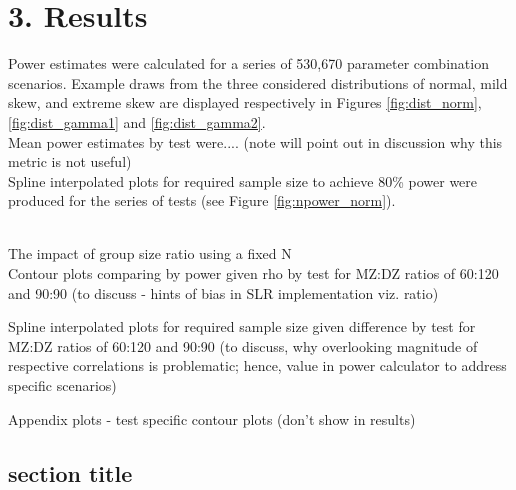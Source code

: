 \chapter*{3. Results}
\setcounter{chapter}{3}
\setcounter{section}{0}

Power estimates were calculated for a series of 530,670 parameter combination scenarios. Example draws from the three considered distributions of normal, mild skew, and extreme skew are displayed respectively in Figures \ref{fig:dist_norm}, \ref{fig:dist_gamma1} and \ref{fig:dist_gamma2}.
\\
Mean power estimates by test were.... (note will point out in discussion why this metric is not useful)
\\
Spline interpolated plots for required sample size to achieve 80\% power were produced for the series of tests (see Figure \ref{fig:npower_norm}).

\\
The impact of group size ratio using a fixed N
\\
Contour plots comparing by power given rho by test for MZ:DZ ratios of 60:120 and 90:90
 (to discuss - hints of bias in SLR implementation viz. ratio)

Spline interpolated plots for required sample size given difference by test for MZ:DZ ratios of 60:120 and 90:90
 (to discuss, why overlooking magnitude of respective correlations is problematic; hence, value in power calculator to address specific scenarios)

Appendix plots - test specific contour plots (don't show in results) 
 

    
    



\section{section title}
    
